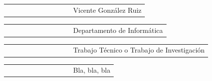 \documentclass[titlepage, 12pt, a4paper, oneside]{article}
\begin{document}
\vspace{0.4cm}
\begin{tabular}{ll}
  ~~~~~~~~~~~~~~~~~ & Vicente González Ruiz
\end{tabular}

\vspace{1.1cm}
\begin{tabular}{ll}
  ~~~~~~~~~~~~~~~~~ & Departamento de Informática
\end{tabular}

\vspace{0.95cm}
\begin{tabular}{ll}
  ~~~~~~~~~~~~~~~~~ & Trabajo Técnico o Trabajo de Investigación %
\end{tabular}

\vspace{0.95cm}
\begin{tabular}{ll}
  ~~~~~~~~~~~~~~~~~ & Bla, bla, bla
\end{tabular}

\clearpage

\end{document}
